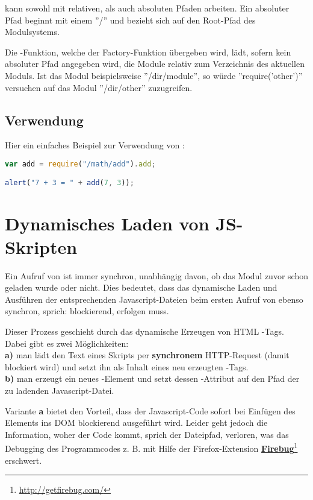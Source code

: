  kann sowohl mit relativen, als auch absoluten Pfaden arbeiten. Ein absoluter Pfad beginnt mit einem ''/'' und bezieht sich auf den Root-Pfad des Modulsystems.

Die -Funktion, welche der Factory-Funktion übergeben wird, lädt, sofern kein absoluter Pfad angegeben wird, die Module relativ zum Verzeichnis des aktuellen Moduls. Ist das Modul beispielsweise ''/dir/module'', so würde ''require('other')'' versuchen auf das Modul ''/dir/other'' zuzugreifen.

\subsection{Verwendung}

Hier ein einfaches Beispiel zur Verwendung von :

\begin{lstlisting}[language=JavaScript, caption=Verwendung von require]
var add = require("/math/add").add;

alert("7 + 3 = " + add(7, 3));
\end{lstlisting}

\section{Dynamisches Laden von JS-Skripten}

Ein Aufruf von  ist immer synchron, unabhängig davon, ob das Modul zuvor schon geladen wurde oder nicht. Dies bedeutet, dass das dynamische Laden und Ausführen der entsprechenden Javascript-Dateien beim ersten Aufruf von  ebenso synchron, sprich: blockierend, erfolgen muss.

Dieser Prozess geschieht durch das dynamische Erzeugen von HTML -Tags. 
Dabei gibt es zwei Möglichkeiten: \\
\textbf{a)} man lädt den Text eines Skripts per \textbf{synchronem} HTTP-Request (damit blockiert wird) und setzt ihn als Inhalt eines neu erzeugten -Tags.\\
\textbf{b)} man erzeugt ein neues -Element und setzt dessen -Attribut auf den Pfad der zu ladenden Javascript-Datei.

Variante \textbf{a} bietet den Vorteil, dass der Javascript-Code sofort bei Einfügen des Elements ins DOM blockierend ausgeführt wird. Leider geht jedoch die Information, woher der Code kommt, sprich der Dateipfad, verloren, was das Debugging des Programmcodes z. B. mit Hilfe der Firefox-Extension \textbf{\href{http://getfirebug.com/}{Firebug}}\footnote{\url{http://getfirebug.com/}} erschwert.


